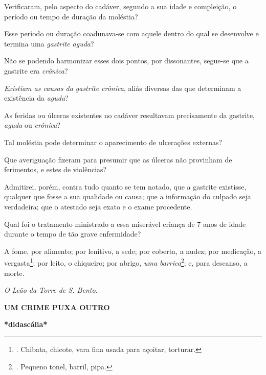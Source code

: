Verificaram, pelo aspecto do cadáver, segundo a sua idade e compleição,
o período ou tempo de duração da moléstia?

Esse período ou duração coadunava-se com aquele dentro do qual se
desenvolve e termina uma \emph{gastrite aguda}?

Não se podendo harmonizar esses dois pontos, por dissonantes, segue-se
que a gastrite era \emph{crônica}?

\emph{Existiam as causas da gastrite crônica}, aliás diversas das que
determinam a existência da \emph{aguda}?

As feridas ou úlceras existentes no cadáver resultavam precisamente da
gastrite, \emph{aguda} ou \emph{crônica}?

Tal moléstia pode determinar o aparecimento de ulcerações externas?

Que averiguação fizeram para presumir que as úlceras não provinham de
ferimentos, e estes de violências?

Admitirei, porém, contra tudo quanto se tem notado, que a gastrite
existisse, qualquer que fosse a sua qualidade ou causa; que a informação
do culpado seja verdadeira; que o atestado seja exato e o exame
procedente.

Qual foi o tratamento ministrado a essa miserável criança de 7 anos de
idade durante o tempo de tão grave enfermidade?

A fome, por alimento; por lenitivo, a sede; por coberta, a nudez; por
medicação, a vergasta\footnote{. Chibata, chicote, vara fina usada para
  açoitar, torturar.}; por leito, o chiqueiro; por abrigo, \emph{uma
barrica}\footnote{. Pequeno tonel, barril, pipa.};
e, para descanso, a morte.

\emph{O Leão da Torre de S. Bento.}

\textbf{UM CRIME PUXA
OUTRO}

\textbf{*didascália*}

